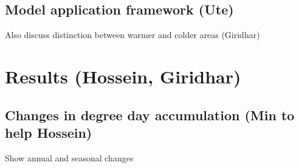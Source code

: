 \documentclass[12pt]{article}
\theoremstyle{plain}
\theoremstyle{definition}
\theoremstyle{definition}
\begin{document}
\subsection{Model application framework (Ute)}

Also discuss distinction between warmer and  colder areas (Giridhar)

\section{Results (Hossein, Giridhar)}
\subsection{Changes in degree day accumulation (Min to help Hossein)}
Show annual and seasonal changes
\end{document}
